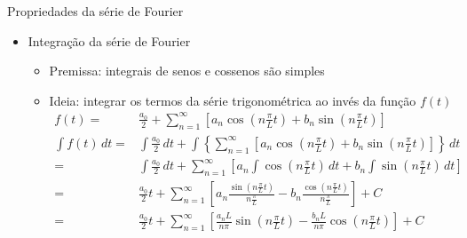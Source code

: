       \begin{slide}[toc = ]{Propriedades da série de Fourier}
	      \begin{itemize}
		      \item Integração da série de Fourier
	      \begin{itemize}
		      \item Premissa: integrais de senos e cossenos são simples
		      \item Ideia: integrar os termos da série trigonométrica ao invés da função $f(t)$
			      \begin{align*}
				      f(t) =& \frac{a_0}{2} + \sum_{n=1}^\infty \left [ a_n \cos \left ( n\frac{\pi}{L}t \right ) + b_n \sin \left ( n\frac{\pi}{L}t \right )\right ]\\
				      \int f(t)\, dt =& \int\frac{a_0}{2}\, dt + \int \left \{ \sum_{n=1}^\infty \left [ a_n \cos \left ( n\frac{\pi}{L}t \right ) + b_n \sin \left ( n\frac{\pi}{L}t \right )\right ] \right \}\, dt\\
				      =& \int\frac{a_0}{2}\, dt + \sum_{n=1}^\infty \left [ a_n \int \cos \left ( n\frac{\pi}{L}t \right )\, dt + b_n \int \sin \left ( n\frac{\pi}{L}t \right )\, dt \right ]\\
					=& \frac{a_0}{2}t + \sum_{n=1}^\infty \left [ a_n \frac{\sin \left ( n\frac{\pi}{L}t \right )}{n\frac{\pi}{L}} - b_n \frac{\cos \left ( n\frac{\pi}{L}t \right )}{n\frac{\pi}{L}} \right ] + C\\
					=& \frac{a_0}{2}t + \sum_{n=1}^\infty \left [ \frac{a_nL}{n\pi}\sin \left ( n\frac{\pi}{L}t \right ) -\frac{b_n L}{n\pi} \cos \left ( n\frac{\pi}{L}t \right ) \right ]+ C\\
			      \end{align*}
	      \end{itemize}
	      \end{itemize}
      \end{slide}

